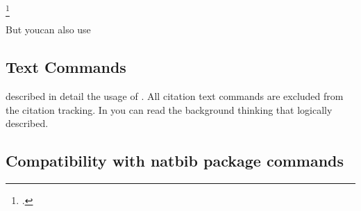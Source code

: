 \begin{refsection}
\footcitetext{Lamport1994}

But youcan also use \autocite{Lamport1994}

\subsection{Text Commands}

\citeauthor{Lamport1994} described in detail the usage of \latex. All citation text commands
are excluded from the citation tracking. In  you can read the background
thinking that logically described.


\subsection{Compatibility with natbib package commands}


\printbibliography[heading=subbibliography]
\end{refsection}




